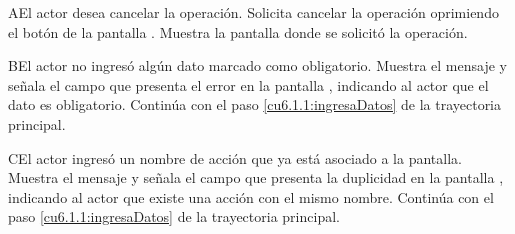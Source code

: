  \begin{UCtrayectoriaA}{A}{El actor desea cancelar la operación.}
    \UCpaso[\UCactor] Solicita cancelar la operación oprimiendo el botón  de la pantalla .
    \UCpaso[\UCsist] Muestra la pantalla donde se solicitó la operación.
 \end{UCtrayectoriaA}
 \begin{UCtrayectoriaA}{B}{El actor no ingresó algún dato marcado como obligatorio.}
    \UCpaso[\UCsist] Muestra el mensaje  y señala el campo que presenta el error en la pantalla 
	    , indicando al actor que el dato es obligatorio.
    \UCpaso[] Continúa con el paso \ref{cu6.1.1:ingresaDatos} de la trayectoria principal.
 \end{UCtrayectoriaA}
 \begin{UCtrayectoriaA}{C}{El actor ingresó un nombre de acción que ya está asociado a la pantalla.}
    \UCpaso[\UCsist] Muestra el mensaje  y señala el campo que presenta la duplicidad en la pantalla 
	    , indicando al actor que existe una acción con el mismo nombre.
    \UCpaso[] Continúa con el paso \ref{cu6.1.1:ingresaDatos} de la trayectoria principal.
 \end{UCtrayectoriaA}
 
